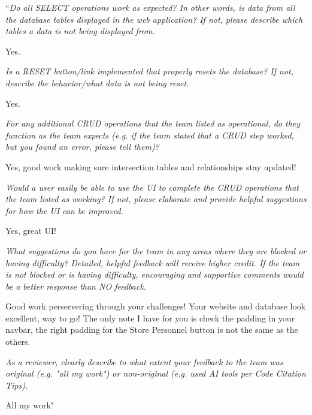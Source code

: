 \documentclass{article}
\begin{document}
\vspace{0.2cm}

\begin{tcolorbox}[colback=secondarycolor, colframe=primarycolor, title=\textbf{Step 4: Peer Review 4 - Noah Pragin}]
``\textit{Do all SELECT operations work as expected? In other words, is data from all the database tables displayed in the web application? If not, please describe which tables a data is not being displayed from.}

\vspace{0.05cm}
 Yes.

\vspace{0.2cm}
\textit{Is a RESET button/link implemented that properly resets the database? If not, describe the behavior/what data is not being reset.}

\vspace{0.05cm}
 Yes.

\vspace{0.2cm}
\textit{For any additional CRUD operations that the team listed as operational, do they function as the team expects (e.g. if the team stated that a CRUD step worked, but you found an error, please tell them)?}

\vspace{0.05cm}
Yes, good work making sure intersection tables and relationships stay updated!

\vspace{0.2cm}
\textit{Would a user easily be able to use the UI to complete the CRUD operations that the team listed as working? If not, please elaborate and provide helpful suggestions for how the UI can be improved.}

\vspace{0.05cm}
Yes, great UI!

\vspace{0.2cm}
\textit{What suggestions do you have for the team in any areas where they are blocked or having difficulty? Detailed, helpful feedback will receive higher credit. If the team is not blocked or is having difficulty, encouraging and supportive comments would be a better response than NO feedback.}

\vspace{0.05cm}
Good work perservering through your challenges! Your website and database look excellent, way to go! The only note I have for you is check the padding in your navbar, the right padding for the Store Personnel button is not the same as the others.

\vspace{0.2cm}
\textit{As a reviewer, clearly describe to what extent your feedback to the team was original (e.g. "all my work") or non-original (e.g. used AI tools per Code Citation Tips). }

\vspace{0.05cm}
All my work"

\end{tcolorbox}
\end{document}
